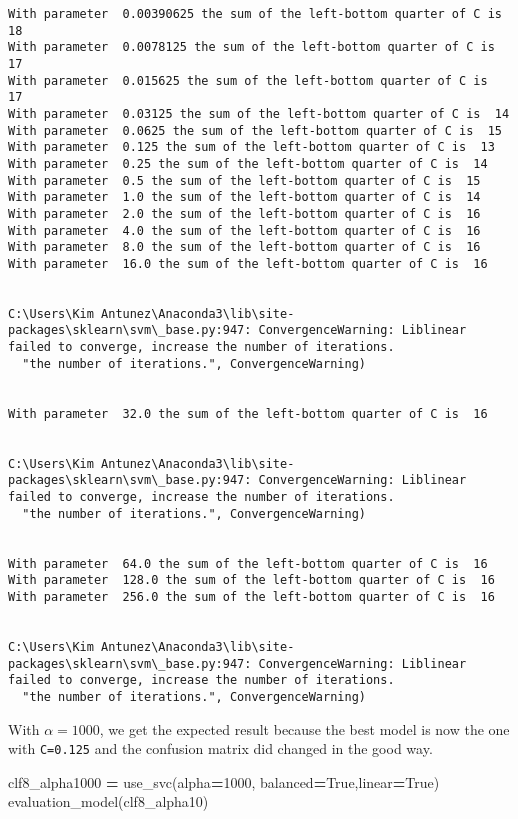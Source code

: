 \documentclass[10pt,a4paper]{article}
\newenvironment{Shaded}{\begin{snugshade}}{\end{snugshade}}
\newcommand{\DecValTok}[1]{\textcolor[rgb]{0.00,0.00,0.81}{#1}}
\newcommand{\NormalTok}[1]{#1}
\newcommand{\OperatorTok}[1]{\textcolor[rgb]{0.81,0.36,0.00}{\textbf{#1}}}
\newcommand{\VariableTok}[1]{\textcolor[rgb]{0.00,0.00,0.00}{#1}}
\theoremstyle{break}
\begin{document}
\begin{verbatim}
With parameter  0.00390625 the sum of the left-bottom quarter of C is  18
With parameter  0.0078125 the sum of the left-bottom quarter of C is  17
With parameter  0.015625 the sum of the left-bottom quarter of C is  17
With parameter  0.03125 the sum of the left-bottom quarter of C is  14
With parameter  0.0625 the sum of the left-bottom quarter of C is  15
With parameter  0.125 the sum of the left-bottom quarter of C is  13
With parameter  0.25 the sum of the left-bottom quarter of C is  14
With parameter  0.5 the sum of the left-bottom quarter of C is  15
With parameter  1.0 the sum of the left-bottom quarter of C is  14
With parameter  2.0 the sum of the left-bottom quarter of C is  16
With parameter  4.0 the sum of the left-bottom quarter of C is  16
With parameter  8.0 the sum of the left-bottom quarter of C is  16
With parameter  16.0 the sum of the left-bottom quarter of C is  16


C:\Users\Kim Antunez\Anaconda3\lib\site-packages\sklearn\svm\_base.py:947: ConvergenceWarning: Liblinear failed to converge, increase the number of iterations.
  "the number of iterations.", ConvergenceWarning)


With parameter  32.0 the sum of the left-bottom quarter of C is  16


C:\Users\Kim Antunez\Anaconda3\lib\site-packages\sklearn\svm\_base.py:947: ConvergenceWarning: Liblinear failed to converge, increase the number of iterations.
  "the number of iterations.", ConvergenceWarning)


With parameter  64.0 the sum of the left-bottom quarter of C is  16
With parameter  128.0 the sum of the left-bottom quarter of C is  16
With parameter  256.0 the sum of the left-bottom quarter of C is  16


C:\Users\Kim Antunez\Anaconda3\lib\site-packages\sklearn\svm\_base.py:947: ConvergenceWarning: Liblinear failed to converge, increase the number of iterations.
  "the number of iterations.", ConvergenceWarning)
\end{verbatim}

With \(\alpha = 1000\), we get the expected result because the best model is now the one with \texttt{C=0.125} and the confusion matrix did changed in the good way.

\begin{Shaded}
\begin{Highlighting}[]
\NormalTok{clf8_alpha1000 }\OperatorTok{=}\NormalTok{ use_svc(alpha}\OperatorTok{=}\DecValTok{1000}\NormalTok{, balanced}\OperatorTok{=}\VariableTok{True}\NormalTok{,linear}\OperatorTok{=}\VariableTok{True}\NormalTok{)}
\NormalTok{evaluation_model(clf8_alpha10)}
\end{Highlighting}
\end{Shaded}
\end{document}
